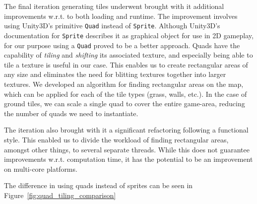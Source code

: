 The final iteration generating tiles underwent brought with it additional
improvements w.r.t. to both loading and runtime. The improvement involves using
Unity3D's primitive \texttt{Quad} instead of \texttt{Sprite}. Although
Unity3D's documentation for \texttt{Sprite} describes it as graphical object
for use in 2D gameplay\cite{unitySprite}, for our purpose using a
\texttt{Quad} proved to be a better approach. Quads have the
capability of \textit{tiling} and \textit{shifting} its associated texture, and
especially being able to tile a texture is useful in our case. This enables us
to create rectangular areas of any size and eliminates the need for blitting
textures together into larger textures. We developed an algorithm for finding
rectangular areas on the map, which can be applied for each of the tile types
(grass, walls, etc.). In the case of ground tiles, we can scale a single quad
to cover the entire game-area, reducing the number of quads we need to
instantiate.

The iteration also brought with it a significant refactoring following a
functional style. This enabled us to divide the workload of finding rectangular
areas, amongst other things, to several separate threads. While this does not
guarantee improvements w.r.t. computation time, it has the potential to be an
improvement on multi-core platforms.

The difference in using quads instead of sprites can be seen
in Figure~\ref{fig:quad_tiling_comparison}

